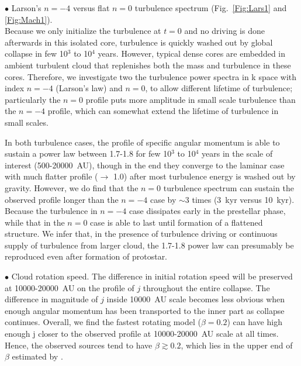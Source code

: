 \noindent $\bullet$ Larson's $n=-4$ versus flat $n=0$ turbulence spectrum (Fig.~\ref{Fig:Lars1} and \ref{Fig:Mach1}).\\
Because we only initialize the turbulence at $t=0$ and no driving
is done afterwards in this isolated core, turbulence is quickly
washed out by global collapse in few 10$^3$ to 10$^4$ years. However, typical
dense cores are embedded in ambient turbulent cloud that replenishes
both the mass and turbulence in these cores.
Therefore, we investigate two the turbulence power spectra in k space
with index $n=-4$ (Larson's law) and $n=0$, to allow different lifetime
of turbulence; particularly the $n=0$ profile puts more amplitude in
small scale turbulence than the $n=-4$ profile, which can somewhat
extend the lifetime of turbulence in small scales.

In both turbulence cases, the profile of specific angular momentum
is able to sustain a power law between 1.7-1.8 for few 10$^3$ to 10$^4$ years
in the scale of interest (500-20000~AU), though in the end they
converge to the laminar case with much flatter profile ($\rightarrow$ 1.0)
after most turbulence energy is washed out by gravity.
However, we do find that the $n=0$ turbulence spectrum can sustain the
observed profile longer than the $n=-4$ case by $\sim$3 times
(3~kyr versus 10~kyr). Because the turbulence in $n=-4$ case dissipates
early in the prestellar phase, while that in the $n=0$ case is
able to last until formation of a flattened structure.
We infer that, in the presence of turbulence driving or continuous supply
of turbulence from larger cloud, the 1.7-1.8 power law can presumably be
reproduced even after formation of protostar.

\noindent $\bullet$ Cloud rotation speed.
The difference in initial rotation speed will be preserved at 10000-20000~AU 
on the profile of $j$ throughout the entire collapse. The difference in magnitude 
of $j$ inside 10000~AU scale becomes less obvious when enough angular momentum has 
been transported to the inner part as collapse continues. 
Overall, we find the fastest rotating model ($\beta=0.2$) can have high enough
j closer to the observed profile at 10000-20000~AU scale at all times. 
Hence, the observed sources tend to have $\beta\gtrsim0.2$, which
lies in the upper end of $\beta$ estimated by \citet{Goodman_1993}.


  

  
  
